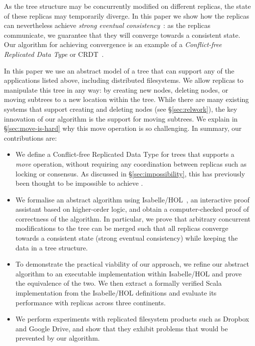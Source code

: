 \documentclass[sigplan,anonymous]{acmart}
\begin{document}
As the tree structure may be concurrently modified on different replicas, the state of these replicas may temporarily diverge.
In this paper we show how the replicas can nevertheless achieve \emph{strong eventual consistency}~\cite{Shapiro:2011un,Gomes:2017gy}: as the replicas communicate, we guarantee that they will converge towards a consistent state.
Our algorithm for achieving convergence is an example of a \emph{Conflict-free Replicated Data Type} or CRDT~\cite{Shapiro:2011wy,Shapiro:2011un}.

In this paper we use an abstract model of a tree that can support any of the applications listed above, including distributed filesystems.
We allow replicas to manipulate this tree in any way: by creating new nodes, deleting nodes, or moving subtrees to a new location within the tree.
While there are many existing systems that support creating and deleting nodes (see \S\ref{sec:relwork}), the key innovation of our algorithm is the support for moving subtrees.
We explain in \S\ref{sec:move-is-hard} why this move operation is so challenging.
In summary, our contributions are:
\begin{itemize}
    \item We define a Conflict-free Replicated Data Type for trees that supports a \emph{move} operation, without requiring any coordination between replicas such as locking or consensus.
        As discussed in \S\ref{sec:impossibility}, this has previously been thought to be impossible to achieve \cite{Najafzadeh:2017vk,Najafzadeh:2018bw}.
    \item We formalise an abstract algorithm using Isabelle/HOL~\cite{DBLP:conf/tphol/WenzelPN08}, an interactive proof assistant based on higher-order logic, and obtain a computer-checked proof of correctness of the algorithm.
        In particular, we prove that arbitrary concurrent modifications to the tree can be merged such that all replicas converge towards a consistent state (strong eventual consistency) while keeping the data in a tree structure.
    \item To demonstrate the practical viability of our approach, we refine our abstract algorithm to an executable implementation within Isabelle/HOL and prove the equivalence of the two.
        We then extract a formally verified Scala implementation from the Isabelle/HOL definitions and evaluate its performance with replicas across three continents.
    \item We perform experiments with replicated filesystem products such as Dropbox and Google Drive, and show that they exhibit problems that would be prevented by our algorithm.
\end{itemize}
\end{document}
